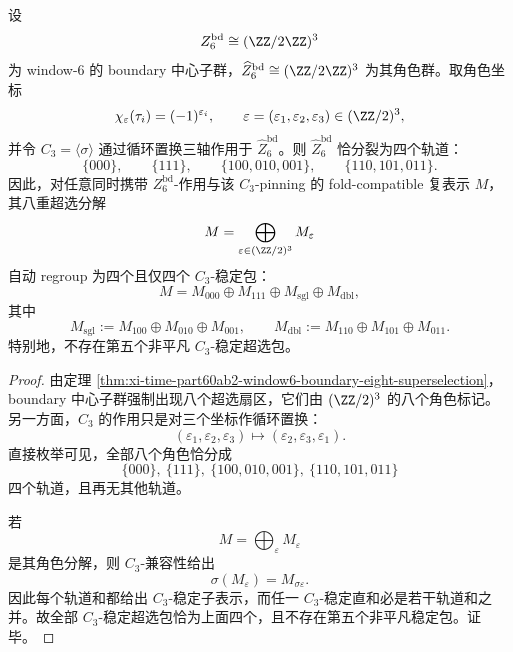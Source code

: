 \begin{theorem}\label{thm:conclusion-window6-boundary-superselection-c3-orbit-stratification}
设
\[
Z_6^{\mathrm{bd}}\cong (\ZZ/2\ZZ)^3
\]
为 window-\(6\) 的 boundary 中心子群，\(\widehat Z_6^{\mathrm{bd}}\cong (\ZZ/2\ZZ)^3\) 为其角色群。取角色坐标
\[
\chi_{\varepsilon}(\tau_i)=(-1)^{\varepsilon_i},
\qquad
\varepsilon=(\varepsilon_1,\varepsilon_2,\varepsilon_3)\in (\ZZ/2)^3,
\]
并令 \(C_3=\langle \sigma\rangle\) 通过循环置换三轴作用于 \(\widehat Z_6^{\mathrm{bd}}\)。则 \(\widehat Z_6^{\mathrm{bd}}\) 恰分裂为四个轨道：
\[
\{000\},\qquad
\{111\},\qquad
\{100,010,001\},\qquad
\{110,101,011\}.
\]
因此，对任意同时携带 \(Z_6^{\mathrm{bd}}\)-作用与该 \(C_3\)-pinning 的 fold-compatible 复表示 \(M\)，其八重超选分解
\[
M=\bigoplus_{\varepsilon\in(\ZZ/2)^3}M_{\varepsilon}
\]
自动 regroup 为四个且仅四个 \(C_3\)-稳定包：
\[
M=M_{000}\oplus M_{111}\oplus M_{\mathrm{sgl}}\oplus M_{\mathrm{dbl}},
\]
其中
\[
M_{\mathrm{sgl}}:=M_{100}\oplus M_{010}\oplus M_{001},
\qquad
M_{\mathrm{dbl}}:=M_{110}\oplus M_{101}\oplus M_{011}.
\]
特别地，不存在第五个非平凡 \(C_3\)-稳定超选包。
\end{theorem}
\begin{proof}
由定理 \ref{thm:xi-time-part60ab2-window6-boundary-eight-superselection}，boundary 中心子群强制出现八个超选扇区，它们由 \((\ZZ/2)^3\) 的八个角色标记。
另一方面，\(C_3\) 的作用只是对三个坐标作循环置换：
\[
(\varepsilon_1,\varepsilon_2,\varepsilon_3)\longmapsto
(\varepsilon_2,\varepsilon_3,\varepsilon_1).
\]
直接枚举可见，全部八个角色恰分成
\[
\{000\},\ \{111\},\ \{100,010,001\},\ \{110,101,011\}
\]
四个轨道，且再无其他轨道。

若
\[
M=\bigoplus_{\varepsilon}M_{\varepsilon}
\]
是其角色分解，则 \(C_3\)-兼容性给出
\[
\sigma(M_{\varepsilon})=M_{\sigma\varepsilon}.
\]
因此每个轨道和都给出 \(C_3\)-稳定子表示，而任一 \(C_3\)-稳定直和必是若干轨道和之并。故全部 \(C_3\)-稳定超选包恰为上面四个，且不存在第五个非平凡稳定包。证毕。
\end{proof}

